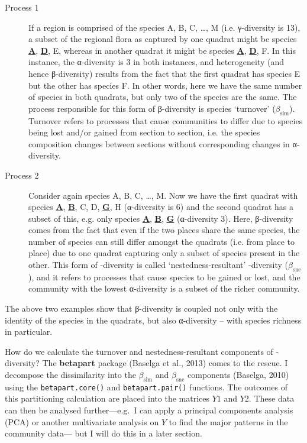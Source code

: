 \documentclass[10pt,a4,]{article}
\begin{document}
\begin{description}
\item[Process 1] If a region is comprised of the species A, B, C, …, M (i.e. γ-diversity is 13), a subset of the regional flora as captured by one quadrat might be species \underline{\textbf{A}}, \underline{\textbf{D}}, E, whereas in another quadrat it might be species \underline{\textbf{A}}, \underline{\textbf{D}}, F. In this instance, the α-diversity is 3 in both instances, and heterogeneity (and hence β-diversity) results from the fact that the first quadrat has species E but the other has species F. In other words, here we have the same number of species in both quadrats, but only two of the species are the same. The process responsible for this form of β-diversity is species ‘turnover’ ($\beta_\text{sim}$). Turnover refers to processes that cause communities to differ due to species being lost and/or gained from section to section, i.e. the species composition changes between sections without corresponding changes in α-diversity.

\item[Process 2] Consider again species A, B, C, …, M. Now we have the first quadrat with species \underline{\textbf{A}}, \underline{\textbf{B}}, C, D, \underline{\textbf{G}}, H (α-diversity is 6) and the second quadrat has a subset of this, e.g. only species \underline{\textbf{A}}, \underline{\textbf{B}}, \underline{\textbf{G}} (α-diversity 3). Here, β-diversity comes from the fact that even if the two places share the same species, the number of species can still differ amongst the quadrats (i.e. from place to place) due to one quadrat capturing only a subset of species present in the other. This form of \textbeta-diversity is called ‘nestedness-resultant’ \textbeta-diversity ($\beta_\text{sne}$), and it refers to  processes that cause species to be gained or lost, and the community with the lowest α-diversity is a subset of the richer community.
\end{description}

The above two examples show that β-diversity is coupled not only with
the identity of the species in the quadrats, but also α-diversity --
with species richness in particular.

How do we calculate the turnover and nestedness-resultant components of
\textbeta-diversity? The \textbf{betapart} package (Baselga et al.,
2013) comes to the rescue. I decompose the dissimilarity into the
\(\beta_\text{sim}\) and \(\beta_\text{sne}\) components (Baselga, 2010)
using the \texttt{betapart.core()} and \texttt{betapart.pair()}
functions. The outcomes of this partitioning calculation are placed into
the matrices \(Y1\) and \(Y2\). These data can then be analysed
further---e.g.~I can apply a principal components analysis (PCA) or
another multivariate analysis on \(Y\) to find the major patterns in the
community data--- but I will do this in a later section.
\end{document}
